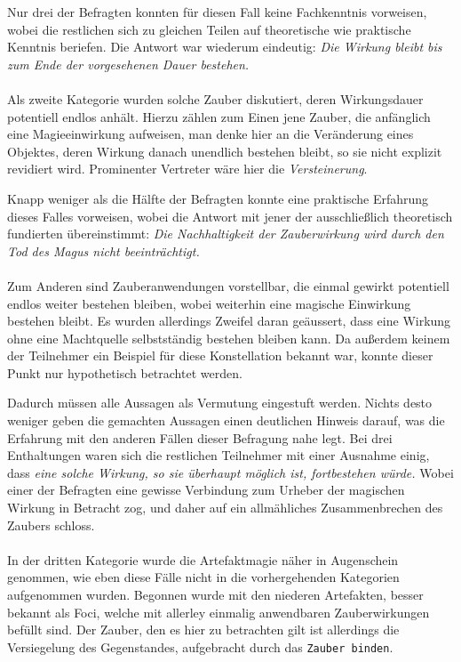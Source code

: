 \documentclass[a5paper,8pt]{book}
\begin{document}
\begin{multicols}{2}
Nur drei der Befragten konnten für diesen Fall keine Fachkenntnis vorweisen, wobei die
restlichen sich zu gleichen Teilen auf theoretische wie praktische Kenntnis beriefen. Die
Antwort war wiederum eindeutig: \emph{Die Wirkung bleibt bis zum Ende der vorgesehenen
Dauer bestehen.}\\
\\
Als zweite Kategorie wurden solche Zauber diskutiert, deren Wirkungsdauer potentiell
endlos anhält. Hierzu zählen zum Einen jene Zauber, die anfänglich eine Magieeinwirkung
aufweisen, man denke hier an die Veränderung eines Objektes, deren Wirkung danach
unendlich bestehen bleibt, so sie nicht explizit revidiert wird. Prominenter Vertreter
wäre hier die \emph{Versteinerung}.

Knapp weniger als die Hälfte der Befragten konnte eine praktische Erfahrung dieses Falles
vorweisen, wobei die Antwort mit jener der ausschließlich theoretisch fundierten
übereinstimmt: \emph{Die Nachhaltigkeit der Zauberwirkung wird durch den Tod des Magus
nicht beeinträchtigt.}\\
\\
Zum Anderen sind Zauberanwendungen vorstellbar, die einmal gewirkt potentiell endlos
weiter bestehen bleiben, wobei weiterhin eine magische Einwirkung bestehen bleibt. Es
wurden allerdings Zweifel daran geäussert, dass eine Wirkung ohne eine Machtquelle
selbstständig bestehen bleiben kann. Da außerdem keinem der Teilnehmer ein Beispiel für
diese Konstellation bekannt war, konnte dieser Punkt nur hypothetisch betrachtet werden.

Dadurch müssen alle Aussagen als Vermutung eingestuft werden. Nichts desto weniger geben
die gemachten Aussagen einen deutlichen Hinweis darauf, was die Erfahrung mit den anderen
Fällen dieser Befragung nahe legt. Bei drei Enthaltungen waren sich die restlichen
Teilnehmer mit einer Ausnahme einig, dass \emph{eine solche Wirkung, so sie überhaupt
möglich ist, fortbestehen würde.} Wobei einer der Befragten eine gewisse Verbindung zum
Urheber der magischen Wirkung in Betracht zog, und daher auf ein allmähliches
Zusammenbrechen des Zaubers schloss.\\
\\
In der dritten Kategorie wurde die Artefaktmagie näher in Augenschein genommen, wie eben
diese Fälle nicht in die vorhergehenden Kategorien aufgenommen wurden. Begonnen wurde mit
den niederen Artefakten, besser bekannt als Foci, welche mit allerley einmalig
anwendbaren Zauberwirkungen befüllt sind. Der Zauber, den es hier zu betrachten gilt ist
allerdings die Versiegelung des Gegenstandes, aufgebracht durch das \texttt{Zauber
binden}.


\end{multicols}
\end{document}
